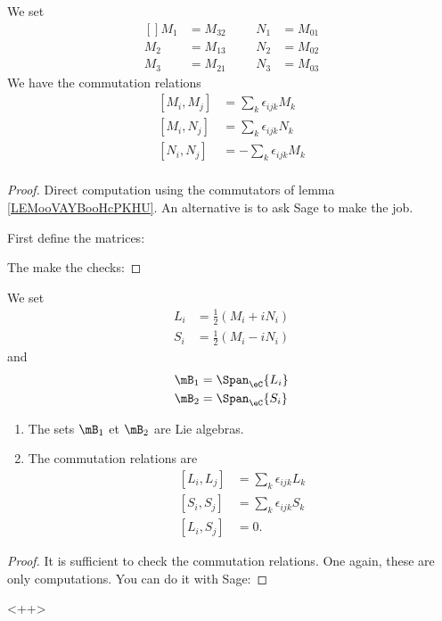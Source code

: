 \begin{lemma}
    We set
    \begin{equation}
        \begin{aligned}[]
            M_1&=M_{32} &&& N_1&=M_{01}\\
            M_2&=M_{13} &&& N_2&=M_{02}\\
            M_3&=M_{21} &&& N_3&=M_{03}
        \end{aligned}
    \end{equation}
    We have the commutation relations
    \begin{subequations}
        \begin{align}
            [M_i,M_j]&=\sum_k\epsilon_{ijk}M_k\\
            [M_i,N_j]&=\sum_k\epsilon_{ijk}N_k\\
            [N_i,N_j]&=-\sum_k\epsilon_{ijk}M_k\\
        \end{align}
    \end{subequations}
\end{lemma}

\begin{proof}
    Direct computation using the commutators of lemma \ref{LEMooVAYBooHcPKHU}. An alternative is to ask Sage\cite{sage} to make the job.

    First define the matrices:
    

    The make the checks:
    
\end{proof}


\begin{lemma}
    We set
    \begin{subequations}
        \begin{align}
            L_i&=\frac{ 1 }{2}(M_i+iN_i)\\
            S_i&=\frac{ 1 }{2}(M_i-iN_i)
        \end{align}
    \end{subequations}
    and
    \begin{subequations}
        \begin{align}
            \mB_1&=\Span_{\eC}\{ L_i \}\\
            \mB_2&=\Span_{\eC}\{ S_i \}
        \end{align}
    \end{subequations}
    \begin{enumerate}
        \item
            The sets \( \mB_1\) et \( \mB_2\) are Lie algebras.
        \item
            The commutation relations are
    \begin{subequations}
        \begin{align}
            [L_i,L_j]&=\sum_k\epsilon_{ijk}L_k\\
            [S_i,S_j]&=\sum_{k}\epsilon_{ijk}S_k\\
            [L_i,S_j]&=0.
        \end{align}
    \end{subequations}
    \end{enumerate}
\end{lemma}

\begin{proof}
    It is sufficient to check the commutation relations. One again, these are only computations. You can do it with Sage:
    
\end{proof}
<++>
